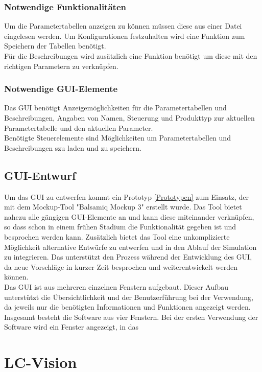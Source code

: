 \documentclass[12pt,a4paper]{article}
\begin{document}
\subsubsection{Notwendige Funktionalitäten}
Um die Parametertabellen anzeigen zu können müssen diese aus einer Datei eingelesen werden. Um Konfigurationen festzuhalten wird eine Funktion zum Speichern der Tabellen benötigt. \\
Für die Beschreibungen wird zusätzlich eine Funktion benötigt um diese mit den richtigen Parametern zu verknüpfen. \\
\subsubsection{Notwendige GUI-Elemente}
Das GUI benötigt Anzeigemöglichkeiten für die Parametertabellen und Beschreibungen, Angaben von Namen, Steuerung und Produkttyp zur aktuellen Parametertabelle und den aktuellen Parameter.\\
Benötigte Steuerelemente sind Möglichkeiten um Parametertabellen und Beschreibungen szu laden und zu speichern. 
\subsection{GUI-Entwurf}
Um das GUI zu entwerfen kommt ein Prototyp \ref{Prototypen} zum Einsatz, der mit dem Mockup-Tool "Balsamiq Mockup 3" erstellt wurde. Das Tool bietet nahezu alle gängigen GUI-Elemente an und kann diese miteinander verknüpfen, so dass schon in einem frühen Stadium die Funktionalität gegeben ist und besprochen werden kann. Zusätzlich bietet das Tool eine unkomplizierte Möglichkeit alternative Entwürfe zu entwerfen und in den Ablauf der Simulation zu integrieren. Das unterstützt den Prozess während der Entwicklung des GUI, da neue Vorschläge in kurzer Zeit besprochen und weiterentwickelt werden können.\\
\newline
Das GUI ist aus mehreren einzelnen Fenstern aufgebaut. Dieser Aufbau unterstützt die Übersichtlichkeit und der Benutzerführung bei der Verwendung, da jeweils nur die benötigten Informationen und Funktionen angezeigt werden.\\ 
Insgesamt besteht die Software aus vier Fenstern. Bei der ersten Verwendung der Software wird ein Fenster angezeigt, in das 
 
\section{LC-Vision}
\newpage

\newpage


\end{document}
